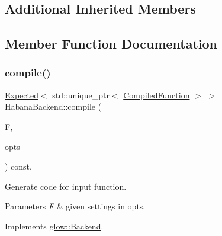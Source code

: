 \subsection*{Additional Inherited Members}


\subsection{Member Function Documentation}
\mbox{\label{classglow_1_1_habana_backend_a0dfa74ae240460b996248124ad726690}} 
\subsubsection{\texorpdfstring{compile()}{compile()}}
{\footnotesize\ttfamily \hyperlink{classglow_1_1detail_1_1_glow_expected}{Expected}$<$ std\+::unique\+\_\+ptr$<$ \hyperlink{classglow_1_1_compiled_function}{Compiled\+Function} $>$ $>$ Habana\+Backend\+::compile (\begin{DoxyParamCaption}\item[{\hyperlink{classglow_1_1_function}{Function} $\ast$}]{F,  }\item[{const \hyperlink{structglow_1_1_backend_options}{Backend\+Options} \&}]{opts }\end{DoxyParamCaption}) const\hspace{0.3cm}{\ttfamily [override]}, {\ttfamily [virtual]}}



Generate code for input function. 


\begin{DoxyParams}{Parameters}
{\em F} & given settings in {\ttfamily opts}. \\
\hline
\end{DoxyParams}


Implements \hyperlink{classglow_1_1_backend_ab5f153ac5a6b2d1824f7a9c80ffc72f1}{glow\+::\+Backend}.

\mbox{\label{classglow_1_1_habana_backend_a8ae721f9f76b5ce37663348fcd8ddeeb}} 
